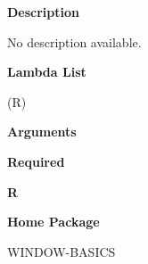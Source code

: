  
{\bf Description}

No description available.

 
{\bf Lambda List}

(R)

 
{\bf Arguments}


\beginhang
{\bf Required}\hspace{2em}
 
{\bf R}


 
\endhang
 
{\bf Home Package}

WINDOW-BASICS

